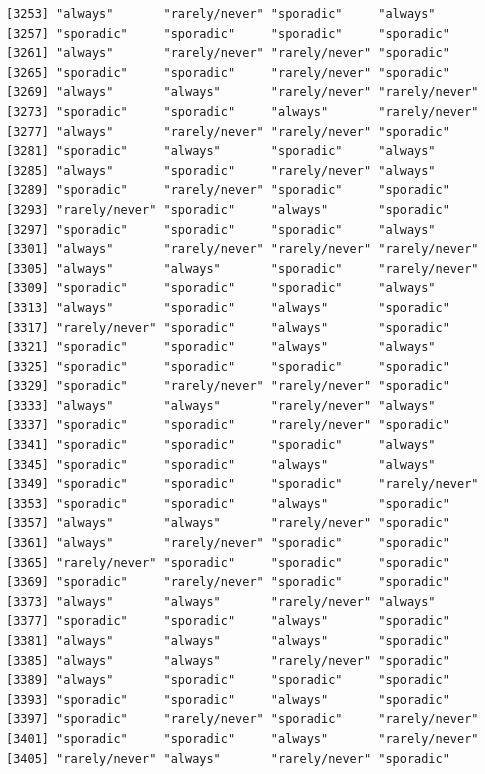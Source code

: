 \documentclass[
  letterpaper,
  DIV=11,
  numbers=noendperiod]{scrartcl}
\begin{document}
\begin{verbatim}
[3253] "always"       "rarely/never" "sporadic"     "always"      
[3257] "sporadic"     "sporadic"     "sporadic"     "sporadic"    
[3261] "always"       "rarely/never" "rarely/never" "sporadic"    
[3265] "sporadic"     "sporadic"     "rarely/never" "sporadic"    
[3269] "always"       "always"       "rarely/never" "rarely/never"
[3273] "sporadic"     "sporadic"     "always"       "rarely/never"
[3277] "always"       "rarely/never" "rarely/never" "sporadic"    
[3281] "sporadic"     "always"       "sporadic"     "always"      
[3285] "always"       "sporadic"     "rarely/never" "always"      
[3289] "sporadic"     "rarely/never" "sporadic"     "sporadic"    
[3293] "rarely/never" "sporadic"     "always"       "sporadic"    
[3297] "sporadic"     "sporadic"     "sporadic"     "always"      
[3301] "always"       "rarely/never" "rarely/never" "rarely/never"
[3305] "always"       "always"       "sporadic"     "rarely/never"
[3309] "sporadic"     "sporadic"     "sporadic"     "always"      
[3313] "always"       "sporadic"     "always"       "sporadic"    
[3317] "rarely/never" "sporadic"     "always"       "sporadic"    
[3321] "sporadic"     "sporadic"     "always"       "always"      
[3325] "sporadic"     "sporadic"     "sporadic"     "sporadic"    
[3329] "sporadic"     "rarely/never" "rarely/never" "sporadic"    
[3333] "always"       "always"       "rarely/never" "always"      
[3337] "sporadic"     "sporadic"     "rarely/never" "sporadic"    
[3341] "sporadic"     "sporadic"     "sporadic"     "always"      
[3345] "sporadic"     "sporadic"     "always"       "always"      
[3349] "sporadic"     "sporadic"     "sporadic"     "rarely/never"
[3353] "sporadic"     "sporadic"     "always"       "sporadic"    
[3357] "always"       "always"       "rarely/never" "sporadic"    
[3361] "always"       "rarely/never" "sporadic"     "sporadic"    
[3365] "rarely/never" "sporadic"     "sporadic"     "sporadic"    
[3369] "sporadic"     "rarely/never" "sporadic"     "sporadic"    
[3373] "always"       "always"       "rarely/never" "always"      
[3377] "sporadic"     "sporadic"     "always"       "sporadic"    
[3381] "always"       "always"       "always"       "sporadic"    
[3385] "always"       "always"       "rarely/never" "sporadic"    
[3389] "always"       "sporadic"     "sporadic"     "sporadic"    
[3393] "sporadic"     "sporadic"     "always"       "sporadic"    
[3397] "sporadic"     "rarely/never" "sporadic"     "rarely/never"
[3401] "sporadic"     "sporadic"     "always"       "rarely/never"
[3405] "rarely/never" "always"       "rarely/never" "sporadic"    

\end{verbatim}
\end{document}
